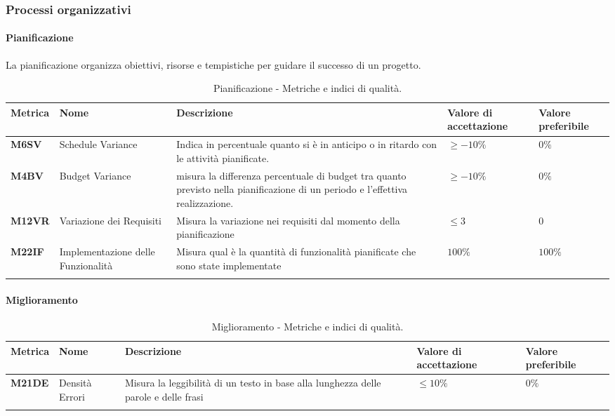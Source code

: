 \subsubsection{Processi organizzativi}

\paragraph{Pianificazione}
La pianificazione organizza obiettivi, risorse e tempistiche per guidare il successo di un progetto.

\hspace{1pt}
    \begin{longtable}{|C{1.5cm}|L{3cm}|L{4cm}|L{2.5cm}|L{2.5cm}|}
        \hline
        \textbf{Metrica} & \textbf{Nome} & \textbf{Descrizione} & \textbf{Valore di accettazione} & \textbf{Valore preferibile} \\
        \hline
        \textbf{M6SV} & Schedule Variance & Indica in percentuale quanto si è in anticipo o in ritardo con le attività
        pianificate. & $\geq -10\%$ & $0\%$ \\
        \hline
        \textbf{M4BV} & Budget Variance & misura la differenza percentuale di budget tra quanto previsto nella 
        pianificazione di un periodo e l’effettiva realizzazione. & $\geq -10\%$ & $0\%$ \\
        \hline
        \textbf{M12VR} & Variazione dei Requisiti & Misura la variazione nei requisiti dal momento della pianificazione & $\leq 3$ & $0$ \\
        \hline
        \textbf{M22IF} & Implementazione delle Funzionalità & Misura qual è la quantità di funzionalità pianificate che sono state implementate & $ 100\%$ & $ 100\%$ \\
        \hline
    \caption{Pianificazione - Metriche e indici di qualità.}
    \label{tab:metriche_pianificazione}
\end{longtable}

\paragraph{Miglioramento}
\hspace{1pt}
    \begin{longtable}{|C{1.5cm}|L{3cm}|L{4cm}|L{2.5cm}|L{2.5cm}|}
        \hline
        \textbf{Metrica} & \textbf{Nome} & \textbf{Descrizione} & \textbf{Valore di accettazione} & \textbf{Valore preferibile} \\
        \hline
        \textbf{M21DE} & Densità Errori & Misura la leggibilità di un testo in base alla lunghezza delle parole e delle frasi & $\leq 10\%$ & $ 0\%$ \\
        \hline
    \caption{Miglioramento - Metriche e indici di qualità.}
    \label{tab:metriche_miglioramento}
\end{longtable}